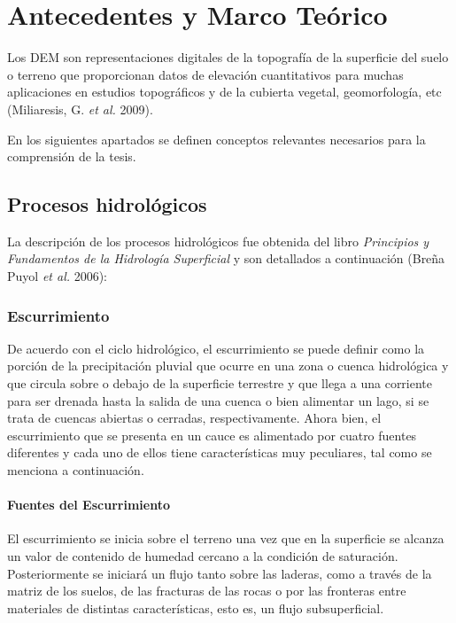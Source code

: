 \documentclass[10pt,a4paper, twoside]{report}
\begin{document}
\chapter{Antecedentes y Marco Teórico}
\label{chap:datosMarcoTeorico}


Los DEM son representaciones digitales de la topografía de la superficie del suelo o terreno que proporcionan datos de elevación cuantitativos para muchas aplicaciones en estudios topográficos y de la cubierta vegetal, geomorfología, etc (Miliaresis, G. \textit{et al.} 2009).

En los siguientes apartados se definen conceptos relevantes necesarios para la comprensión de la tesis.

\section{Procesos hidrológicos}
\label{sec:proc-hidr}

La descripción de los procesos hidrológicos fue obtenida del libro \textit{Principios y Fundamentos de la Hidrología Superficial} y son detallados a continuación (Breña Puyol \textit{et al.} 2006):

\subsection{Escurrimiento}
\label{subsec:escurr}

De acuerdo con el ciclo hidrológico, el escurrimiento se puede definir como la 
porción de la precipitación pluvial que ocurre en una zona o cuenca 
hidrológica y que circula sobre o debajo de la superficie terrestre y que llega 
a una corriente para ser drenada hasta la salida de una cuenca o bien 
alimentar un lago, si se trata de cuencas abiertas o cerradas, 
respectivamente. 
Ahora bien, el escurrimiento que se presenta en un cauce es alimentado por 
cuatro fuentes diferentes y cada uno de ellos tiene características muy 
peculiares, tal como se menciona a continuación.

\subsubsection{Fuentes del Escurrimiento}
\label{subsec:fuentesEscurr}

El escurrimiento se inicia sobre el terreno una vez que en la superficie se 
alcanza un valor de contenido de humedad cercano a la condición de 
saturación. Posteriormente se iniciará un flujo tanto sobre las laderas, como 
a través de la matriz de los suelos, de las fracturas de las rocas o por las 
fronteras entre materiales de distintas características, esto es, un flujo 
subsuperficial. 
\end{document}
